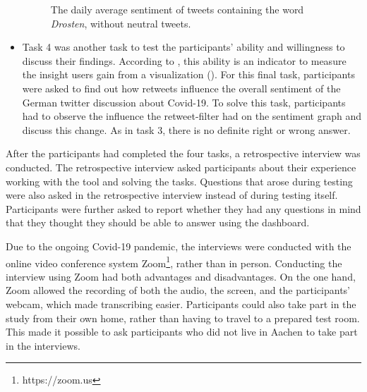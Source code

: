 \begin{itemize}
    \begin{figure}[htb]
        \caption{The daily average sentiment of tweets containing the word \emph{Drosten}, without neutral tweets.}
        \label{fig:sentiment_drosten_noneutral}
    \end{figure}
    \item Task 4 was another task to test the participants' ability and willingness to discuss their findings. According to \citeauthor{northMeasuringVisualizationInsight2006}, this ability is an indicator to measure the insight users gain from a visualization (\cite{northMeasuringVisualizationInsight2006}). For this final task, participants were asked to find out how retweets influence the overall sentiment of the German twitter discussion about Covid-19. To solve this task, participants had to observe the influence the retweet-filter had on the sentiment graph and discuss this change. As in task 3, there is no definite right or wrong answer.
\end{itemize}

After the participants had completed the four tasks, a retrospective interview was conducted. The retrospective interview asked participants about their experience working with the tool and solving the tasks. Questions that arose during testing were also asked in the retrospective interview instead of during testing itself. Participants were further asked to report whether they had any questions in mind that they thought they should be able to answer using the dashboard.

Due to the ongoing Covid-19 pandemic, the interviews were conducted with the online video conference system Zoom\footnote{https://zoom.us}, rather than in person. Conducting the interview using Zoom had both advantages and disadvantages. On the one hand, Zoom allowed the recording of both the audio, the screen, and the participants' webcam, which made transcribing easier. Participants could also take part in the study from their own home, rather than having to travel to a prepared test room. This made it possible to ask participants who did not live in Aachen to take part in the interviews.

